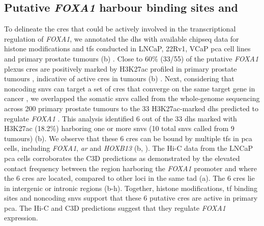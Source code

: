 
\subsection{Putative \emph{FOXA1}  harbour  binding sites and }

To delineate the \glspl{cre} that could be actively involved in the transcriptional regulation of \emph{FOXA1}, we annotated the \gls{dhs} with available \gls{chipseq} data for histone modifications and \glspl{tf} conducted in LNCaP, 22Rv1, VCaP \gls{pca} cell lines and primary prostate tumours (b) \cite{pomerantzAndrogenReceptorCistrome2015,kronTMPRSS2ERGFusion2017}.
Close to 60\% (33/55) of the putative \emph{FOXA1} plexus \glspl{cre} are positively marked by H3K27ac profiled in primary prostate tumours \cite{kronTMPRSS2ERGFusion2017}, indicative of active \glspl{cre} in tumours (b) \cite{creyghtonHistoneH3K27acSeparates2010}.
Next, considering that noncoding \Glspl{snv} can target a set of \glspl{cre} that converge on the same target gene in cancer \cite{baileyNoncodingSomaticInherited2016}, we overlapped the somatic \Glspl{snv} called from the whole-genome sequencing across 200 primary prostate tumours to the 33 H3K27ac-marked \gls{dhs} predicted to regulate \emph{FOXA1} \cite{fraserGenomicHallmarksLocalized2017,espirituEvolutionaryLandscapeLocalized2018}.
This analysis identified 6 out of the 33 \gls{dhs} marked with H3K27ac (18.2\%) harboring one or more \glspl{snv} (10 total \glspl{snv} called from 9 tumours) (b).
We observe that these 6 \glspl{cre} can be bound by multiple \glspl{tf} in \gls{pca} cells, including \emph{FOXA1}, \emph{\gls{ar}} and \emph{HOXB13} (b, ).
The Hi-C data from the LNCaP \gls{pca} cells corroborates the C3D predictions as demonstrated by the elevated contact frequency between the region harboring the \emph{FOXA1} promoter and where the 6 \glspl{cre} are located, compared to other loci in the same \gls{tad} (a).
The 6 \glspl{cre} lie in intergenic or intronic regions (b-h).
Together, histone modifications, \gls{tf} binding sites and noncoding \glspl{snv} support that these 6 putative \glspl{cre} are active in primary \gls{pca}.
The Hi-C and C3D predictions suggest that they regulate \emph{FOXA1} expression.

